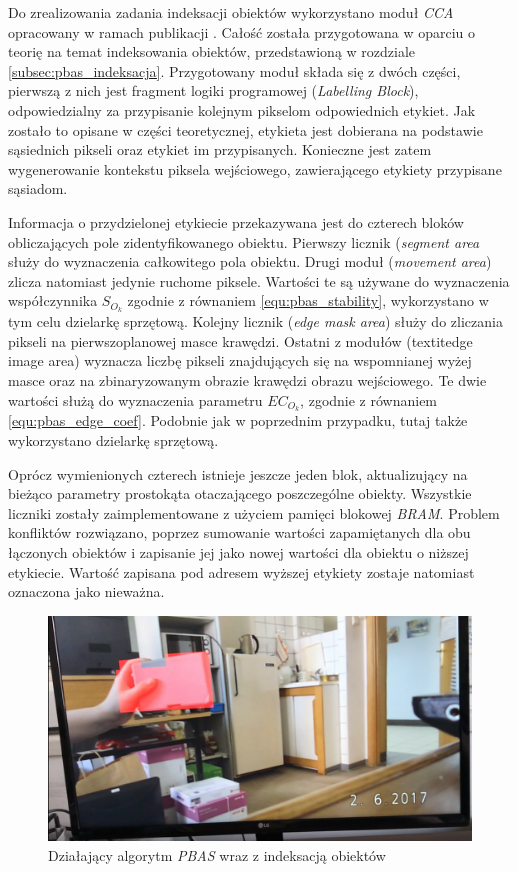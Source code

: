 Do zrealizowania zadania indeksacji obiektów wykorzystano moduł \textit{CCA} opracowany w ramach publikacji \cite{kryjak_14_pbas}. Całość została przygotowana w oparciu o teorię na temat indeksowania obiektów, przedstawioną w rozdziale \ref{subsec:pbas_indeksacja}. Przygotowany moduł składa się z dwóch części, pierwszą z nich jest fragment logiki programowej (\textit{Labelling Block}), odpowiedzialny za przypisanie kolejnym pikselom odpowiednich etykiet. Jak zostało to opisane w części teoretycznej, etykieta jest dobierana na podstawie sąsiednich pikseli oraz etykiet im przypisanych. Konieczne jest zatem wygenerowanie kontekstu piksela wejściowego, zawierającego etykiety przypisane sąsiadom.

Informacja o przydzielonej etykiecie przekazywana jest do czterech bloków obliczających pole zidentyfikowanego obiektu. Pierwszy licznik (\textit{segment area} służy do wyznaczenia całkowitego pola obiektu. Drugi moduł (\textit{movement area}) zlicza natomiast jedynie ruchome piksele. Wartości te są używane do wyznaczenia współczynnika $S_{O_k}$ zgodnie z równaniem \ref{equ:pbas_stability}, wykorzystano w tym celu dzielarkę sprzętową. Kolejny licznik (\textit{edge mask area}) służy do zliczania pikseli na pierwszoplanowej masce krawędzi. Ostatni z modułów (textit{edge image area}) wyznacza liczbę pikseli znajdujących się na wspomnianej wyżej masce oraz na zbinaryzowanym obrazie krawędzi obrazu wejściowego. Te dwie wartości służą do wyznaczenia parametru $EC_{O_k}$, zgodnie z równaniem \ref{equ:pbas_edge_coef}. Podobnie jak w poprzednim przypadku, tutaj także wykorzystano dzielarkę sprzętową.

Oprócz wymienionych czterech istnieje jeszcze jeden blok, aktualizujący na bieżąco parametry prostokąta otaczającego poszczególne obiekty. Wszystkie liczniki zostały zaimplementowane z użyciem pamięci blokowej \textit{BRAM}. Problem konfliktów rozwiązano, poprzez sumowanie wartości zapamiętanych dla obu łączonych obiektów i zapisanie jej jako nowej wartości dla obiektu o niższej etykiecie. Wartość zapisana pod adresem wyższej etykiety zostaje natomiast oznaczona jako nieważna.

	\begin{figure}[h!]
		\centering
		\includegraphics[scale=0.2]{img/4/pbas_plus_example.png}
		\caption{Działający algorytm \textit{PBAS} wraz z indeksacją obiektów}
		\label{fig:pbas_plus_demo}
	\end{figure}

